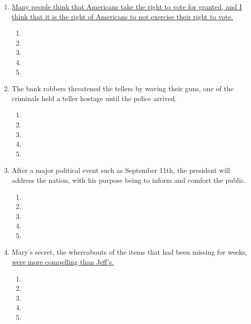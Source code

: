 \begin{enumerate}
\bigskip
\item \ul{Many people think that Americans take the right to vote for granted, and I think that it is the right of Americans to not exercise their right to vote.}

\bigskip
\begin{enumerate}[label=(\Alph*)]
\item\hrulefill
\item\hrulefill
\item\hrulefill
\item\hrulefill
\item\hrulefill
\end{enumerate}

\bigskip
\item The bank robbers threatened the tellers by waving their guns, one of the criminals held a teller hostage until the police arrived. 

\bigskip
\begin{enumerate}[label=(\Alph*)]
\item\hrulefill
\item\hrulefill
\item\hrulefill
\item\hrulefill
\item\hrulefill
\end{enumerate}

\bigskip
\item After a major political event such as September 11th, the president will address the nation, with his purpose being to inform and comfort the public.

\bigskip
\begin{enumerate}[label=(\Alph*)]
\item\hrulefill
\item\hrulefill
\item\hrulefill
\item\hrulefill
\item\hrulefill
\end{enumerate}

\bigskip
\item Mary's secret, the whereabouts of the items that had been missing for weeks, \ul{were more compelling than Jeff's.}

\bigskip
\begin{enumerate}[label=(\Alph*)]
\item\hrulefill
\item\hrulefill
\item\hrulefill
\item\hrulefill
\item\hrulefill
\end{enumerate}

\end{enumerate}
